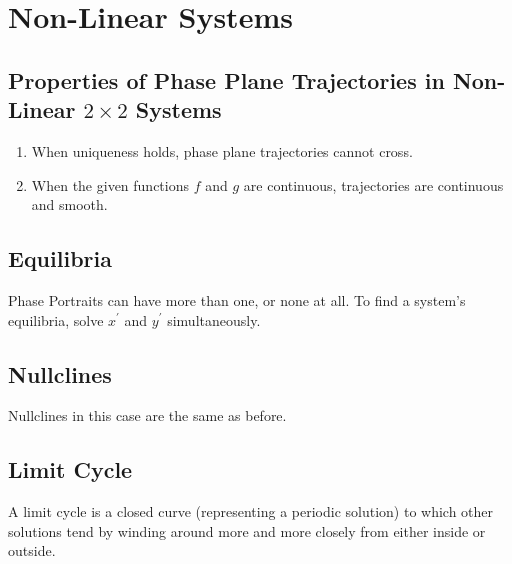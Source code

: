 \documentclass[12pt,landscape,twocolumn]{article}
\begin{document}
\section{Non-Linear Systems}
    \subsection{Properties of Phase Plane Trajectories in Non-Linear $2 \times 2$ Systems}
    \begin{enumerate}
        \item When uniqueness holds, phase plane trajectories cannot cross.
        \item When the given functions $f$ and $g$ are continuous, trajectories are continuous and smooth.
    \end{enumerate}

    \subsection{Equilibria}
    Phase Portraits can have more than one, or none at all. To find a system's equilibria, solve $x^\prime$ and $y^\prime$ simultaneously.

    \subsection{Nullclines}
    Nullclines in this case are the same as before.

    \subsection{Limit Cycle}
    A limit cycle is a closed curve (representing a periodic solution) to which other solutions tend by winding around more and more closely from either inside or outside.
\end{document}
